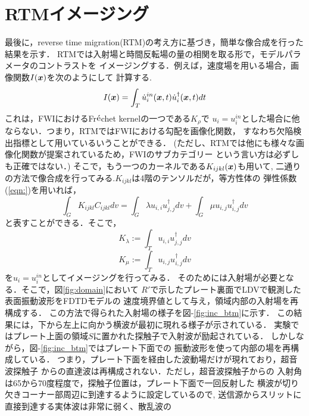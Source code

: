 \section{RTMイメージング}
最後に，reverse time migration(RTM)の考え方に基づき，簡単な像合成を行った結果を示す．
RTMでは入射場と時間反転場の量の相関を取る形で，モデルパラメータのコントラストを
イメージングする．例えば，速度場を用いる場合，画像関数$I(\boldsymbol{x})$を次のようにして
計算する.
\begin{equation}
	I(\boldsymbol{x})=\int_T \dot u^{in}_i(\boldsymbol{x},t) \dot u_i^{\dagger}(\boldsymbol{x},t)dt
	\label{eqn:Ix}
\end{equation}
これは，FWIにおけるFr$\acute{\rm e}$chet kernelの一つである$K_\rho$で
$u_i=u_i^{in}$とした場合に他ならない．つまり，RTMではFWIにおける勾配を画像化関数，
すなわち欠陥検出指標として用いているいうことができる．
(ただし、RTMでは他にも様々な画像化関数が提案されているため，FWIのサブカテゴリー
という言い方は必ずしも正確ではない．)
そこで，もう一つのカーネルである$K_{ijkl}(\boldsymbol{x})$も用いて,
二通りの方法で像合成を行ってみる.$K_{ijkl}$は4階のテンソルだが，等方性体の
弾性係数(\ref{eqn:})を用いれば，
\begin{equation}
	\int_G K_{ijkl}C_{ijkl}dv
	=
	\int_G \lambda u_{i,i}u^{\dagger}_{j,j} dv
	+
	\int_G \mu u_{i,j}u^{\dagger}_{i,j} dv
	\label{eqn:}
\end{equation}
と表すことができる．そこで，
\begin{equation}
	K_\lambda:= \int_T u_{i,i}u^{\dagger}_{j,j} dv
	\label{eqn:}
\end{equation}
\begin{equation}
	K_\mu:= \int_T u_{i,j}u^{\dagger}_{i,j} dv
	\label{eqn:}
\end{equation}
を$u_i=u_i^{in}$としてイメージングを行ってみる．
そのためには入射場が必要となる．そこで，図\ref{fig:domain}において
$R'$で示したプレート裏面でLDVで観測した表面振動波形をFDTDモデルの
速度境界値として与え，領域内部の入射場を再構成する．
この方法で得られた入射場の様子を{\rm 図}-\ref{fig:inc_btm}に示す．
この結果には，下から左上に向かう横波が最初に現れる様子が示されている．
実験ではプレート上面の領域$S$に置かれた探触子で入射波が励起されている．
しかしながら，{\rm 図}-\ref{fig:inc_btm}ではプレート下面での
振動波形を使って内部の場を再構成している．
つまり，プレート下面を経由した波動場だけが現れており，超音波探触子
からの直達波は再構成されない．ただし，超音波探触子からの
入射角は65から70度程度で，探触子位置は，プレート下面で一回反射した
横波が切り欠きコーナー部周辺に到達するように設定しているので,
送信源からスリットに直接到達する実体波は非常に弱く、散乱波の
